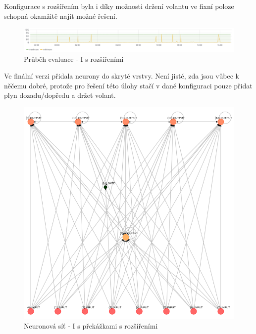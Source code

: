 Konfigurace s rozšířením byla i díky možnosti držení volantu ve fixní poloze schopná okamžitě najít možné řešení.
\begin{figure}[H]
	\centering
	\includegraphics[width=1.0\linewidth]{solutions/Ibasic/advancedGraph}
	\caption{Průběh evaluace - I s rozšířeními}
	\label{fig:IbasicAdvancedGraph}
\end{figure}
Ve finální verzi přidala neurony do skryté vrstvy. Není jisté, zda jsou vůbec k něčemu dobré, protože pro řešení této úlohy stačí v dané konfiguraci pouze přidat plyn dozadu/dopředu a držet volant.
\begin{figure}[H]
	\centering
	\includegraphics[width=0.6\linewidth]{solutions/Ibasic/advanced}
	\caption{Neuronová síť - I s překážkami s rozšířeními}
	\label{fig:basicAdvanced}
\end{figure}

